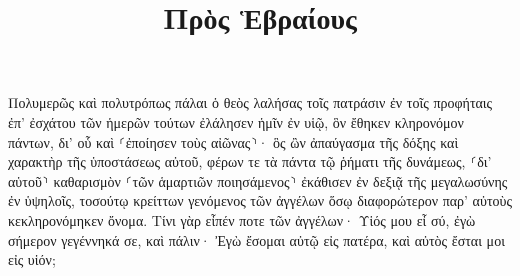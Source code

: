 \documentclass{openreader}
\title{Πρὸς Ἑβραίους}
\date{}
\begin{document}
\maketitle
\raggedbottom 
\fontsize{16pt}{24pt}\selectfont


Πολυμερῶς καὶ πολυτρόπως πάλαι ὁ θεὸς λαλήσας τοῖς πατράσιν ἐν τοῖς προφήταις 
ἐπ’ ἐσχάτου τῶν ἡμερῶν τούτων ἐλάλησεν ἡμῖν ἐν υἱῷ, ὃν ἔθηκεν κληρονόμον πάντων, δι’ οὗ καὶ ⸂ἐποίησεν τοὺς αἰῶνας⸃· 
ὃς ὢν ἀπαύγασμα τῆς δόξης καὶ χαρακτὴρ τῆς ὑποστάσεως αὐτοῦ, φέρων τε τὰ πάντα τῷ ῥήματι τῆς δυνάμεως, ⸂δι’ αὑτοῦ⸃ καθαρισμὸν ⸂τῶν ἁμαρτιῶν ποιησάμενος⸃ ἐκάθισεν ἐν δεξιᾷ τῆς μεγαλωσύνης ἐν ὑψηλοῖς, 
τοσούτῳ κρείττων γενόμενος τῶν ἀγγέλων ὅσῳ διαφορώτερον παρ’ αὐτοὺς κεκληρονόμηκεν ὄνομα. 
Τίνι γὰρ εἶπέν ποτε τῶν ἀγγέλων· Υἱός μου εἶ σύ, ἐγὼ σήμερον γεγέννηκά σε, καὶ πάλιν· Ἐγὼ ἔσομαι αὐτῷ εἰς πατέρα, καὶ αὐτὸς ἔσται μοι εἰς υἱόν; 
\end{document}
